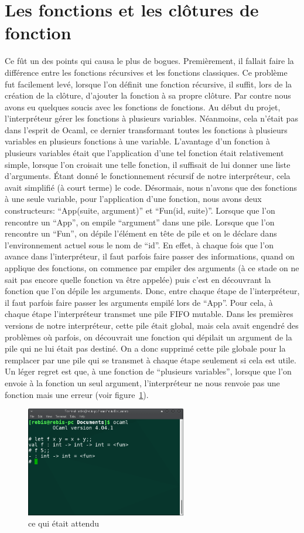 \documentclass[10pt,a4paper]{article}
\begin{document}
\section{Les fonctions et les clôtures de fonction}
Ce fût un des points qui causa le plus de bogues. Premièrement, il fallait faire la différence entre les fonctions récursives et les fonctions classiques. Ce problème fut facilement levé, lorsque l'on définit une fonction récursive, il suffit, lors de la création de la clôture, d'ajouter la fonction à sa propre clôture. Par contre nous avons eu quelques soucis avec les fonctions de fonctions. Au début du projet, l'interpréteur gérer les fonctions à plusieurs variables. Néanmoins, cela n'était pas dans l'esprit de Ocaml, ce dernier transformant toutes les fonctions à plusieurs variables en plusieurs fonctions à une variable. L'avantage d'un fonction à plusieurs variables était que l'application d'une tel fonction était relativement simple, lorsque l'on croisait une telle fonction, il suffisait de lui donner une liste d'arguments. Étant donné le fonctionnement récursif de notre interpréteur, cela avait simplifié (à court terme) le code. Désormais, nous n'avons que des fonctions à une seule variable, pour l'application d'une fonction, nous avons deux constructeurs: ``App(suite, argument)'' et ``Fun(id, suite)''. Lorsque que l'on rencontre un ``App'', on empile ``argument'' dans une pile. Lorsque que l'on rencontre un ``Fun'', on dépile l'élément en tête de pile et on le déclare dans l'environnement actuel sous le nom de ``id''. En effet, à chaque fois que l'on avance dans l'interpréteur, il faut parfois faire passer des informations, quand on applique des fonctions, on commence par empiler des arguments (à ce stade on ne sait pas encore quelle fonction va être appelée) puis c'est en découvrant la fonction que l'on dépile les arguments. Donc, entre chaque étape de l'interpréteur, il faut parfois faire passer les arguments empilé lors de ``App''. Pour cela, à chaque étape l'interpréteur transmet une pile FIFO mutable. Dans les premières versions de notre interpréteur, cette pile était global, mais cela avait engendré des problèmes où parfois, on découvrait une fonction qui dépilait un argument de la pile qui ne lui était pas destiné. On a donc supprimé cette pile globale pour la remplacer par une pile qui se transmet à chaque étape seulement si cela est utile. Un léger regret est que, à une fonction de ``plusieurs variables'', lorsque que l'on envoie à la fonction un seul argument, l'interpréteur ne nous renvoie pas une fonction mais une erreur (voir figure~\ref{fig:ex1}).
\begin{figure}
  \center
  \includegraphics[width=7cm]{exemple1.png}
  \caption{ce qui était attendu}
  \label{fig:ex1}
\end{figure}
\end{document}
